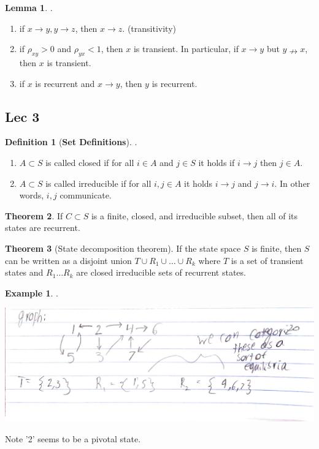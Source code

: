 \documentclass[12pt]{article}
\theoremstyle{definition}
\newtheorem{definition}{Definition}[section]
\newtheorem{theorem}{Theorem}[section]
\newtheorem{lemma}[theorem]{Lemma}
\newtheorem{example}{Example}[section]
\begin{document}
\begin{lemma}. \newline
  \begin{enumerate}
    \item if $x \rightarrow y, y \rightarrow z$, then $ x \rightarrow z$. (transitivity)
    \item if $\rho_{xy} > 0$ and $\rho_{yx} < 1$, then $x$ is transient. In particular, if $x \rightarrow y$ but $y \nrightarrow x$, then $x$ is transient.
    \item if $x$ is recurrent and $x \rightarrow y$, then $y$ is recurrent.
  \end{enumerate}

\end{lemma}

\subsection{Lec 3}


\begin{definition}[\textbf{Set Definitions}] . \newline
  \begin{enumerate}
    \item $A \subset S$ is called closed if for all $i \in A$ and $j \in S$ it holds if $i \rightarrow j$ then $j \in A$.
    \item $A \subset S$ is called irreducible if for all $i, j \in A$ it holds $i \rightarrow j$ and $j \rightarrow i$. In other words, $i,j$ communicate.
  \end{enumerate}
\end{definition}



\begin{theorem}
  If $C \subset S$ is a finite, closed, and irreducible subset, then all of its states are recurrent.
\end{theorem}


\begin{theorem}[State decomposition theorem]
  If the state space $S$ is finite, then $S$ can be written as a disjoint union $T \cup R_1 \cup \dots \cup R_k$ where $T$ is a set of transient states and $R_1 \dots R_k$ are closed irreducible sets of recurrent states.
\end{theorem}


\begin{example}.  \newline
  \begin{center}
  \includegraphics[scale = .5]{example3point2.png}
\end{center}
Note '2' seems to be a pivotal state.
\end{example}
\end{document}
